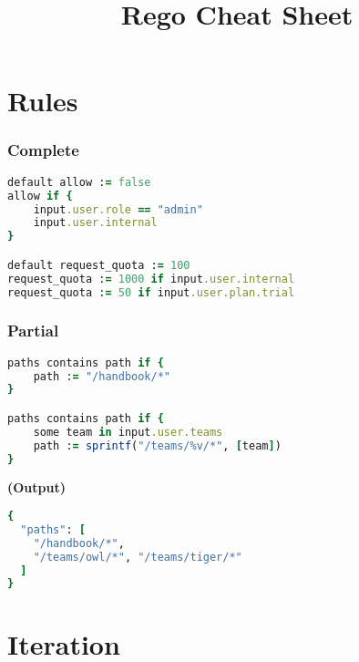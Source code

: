 \documentclass[twocolumn]{article}
\makeatletter
\renewcommand{\maketitle}{\bgroup\setlength{\parindent}{0pt}
\textbf{\LARGE{\@title}}
}
\makeatother
\begin{document}
\pagestyle{logo}
\title{Rego Cheat Sheet}

\maketitle
\vspace{-1em}





\section*{Rules}




\vspace{-1em}
\subsubsection*{Complete}

\begin{lstlisting}[language=Ruby]
default allow := false
allow if {
	input.user.role == "admin"
	input.user.internal
}

default request_quota := 100
request_quota := 1000 if input.user.internal
request_quota := 50 if input.user.plan.trial
\end{lstlisting}





\vspace{-1em}
\subsubsection*{Partial}

\begin{lstlisting}[language=Ruby]
paths contains path if {
	path := "/handbook/*"
}

paths contains path if {
	some team in input.user.teams
	path := sprintf("/teams/%v/*", [team])
}
\end{lstlisting}



\textbf{\tiny{(Output)}}
\begin{lstlisting}[language=Ruby]
{
  "paths": [
    "/handbook/*",
    "/teams/owl/*", "/teams/tiger/*"
  ]
}
\end{lstlisting}







\section*{Iteration}
\end{document}
